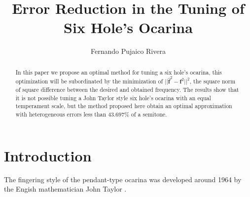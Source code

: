 \documentclass{article}
\title{ Error Reduction in the Tuning of Six Hole's Ocarina }
\author{Fernando Pujaico Rivera}
\date{ }
\begin{document}
\maketitle


\begin{abstract}
In this paper we propose an optimal method for tuning a six hole's ocarina,
this optimization will be subordinated by the minimization of $|| \mathbf{\hat{f}}^2-\mathbf{f}^2||^2$, 
the square norm of square difference between the desired and obtained frequency.
The results show that it is not possible tuning a John Taylor style six hole's ocarina with an equal temperament scale,
but the method proposed here obtain an optimal approximation with heterogeneous errors less than $43.697\%$ of a semitone.
\end{abstract}



\section{Introduction}

The fingering style of the pendant-type ocarina was developed around 1964 
by the Engish mathematician John Taylor \cite[pp. 79]{metropolitan1985american} \cite[pp. 10]{galpin2001newsletter}.

\end{document}
